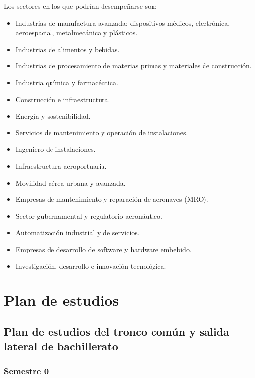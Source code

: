Los sectores en los que podrían desempeñarse son:\par

\begin{itemize}
\item Industrias de manufactura avanzada: dispositivos médicos, electrónica, aeroespacial, metalmecánica y plásticos.
\item Industrias de alimentos y bebidas.
\item Industrias de procesamiento de materias primas y materiales de construcción.
\item Industria química y farmacéutica.
\item Construcción e infraestructura.
\item Energía y sostenibilidad.
\item Servicios de mantenimiento y operación de instalaciones.
\item Ingeniero de instalaciones.
\item Infraestructura aeroportuaria.
\item Movilidad aérea urbana y avanzada.
\item Empresas de mantenimiento y reparación de aeronaves (MRO).
\item Sector gubernamental y regulatorio aeronáutico.
\item Automatización industrial y de servicios.
\item Empresas de desarrollo de software y hardware embebido.
\item Investigación, desarrollo e innovación tecnológica.
\end{itemize}
\section*{Plan de estudios}

\subsection*{Plan de estudios del tronco común y salida lateral de bachillerato}

\subsubsection*{Semestre 0}

